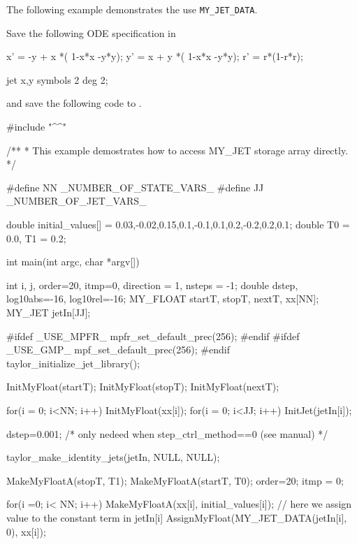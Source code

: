 \documentclass[10pt]{article}
\theoremstyle{remark}
\newcommand{\inputfile}{}
\newcommand{\mainfile}{}
\newcommand{\odehfile}{}
\begin{document}
\vspace{4mm}

The following example demonstrates the use \verb+MY_JET_DATA+.

\vspace{4mm}
Save the following ODE specification in \inputfile{}
\begin{code}[title={File: \inputfile{}}]
    x' = -y + x *( 1-x*x -y*y);
    y' =  x + y *( 1-x*x -y*y);
    r' = r*(1-r*r);
    
    jet x,y  symbols 2 deg 2;
\end{code}
and save the following code to \mainfile{}.
\begin{code}[title={File: \mainfile{}}]
    #include "^\odehfile{}^"
    
    /**
     *  This example demostrates how to access MY_JET storage array directly.
     */
    
    #define NN  _NUMBER_OF_STATE_VARS_
    #define JJ  _NUMBER_OF_JET_VARS_ 
    
    double initial_values[] = {0.03,-0.02,0.15,0.1,-0.1,0.1,0.2,-0.2,0.2,0.1};
    double T0 = 0.0, T1 = 0.2;
     
    int main(int argc, char *argv[])
    {
    	 int       i, j, order=20, itmp=0, direction = 1, nsteps = -1;
    	 double    dstep, log10abs=-16, log10rel=-16;
    	 MY_FLOAT  startT, stopT, nextT, xx[NN];
    	 MY_JET    jetIn[JJ];
    	 
    #ifdef _USE_MPFR_	 
    	 mpfr_set_default_prec(256);
    #endif
    #ifdef _USE_GMP_	 
    	 mpf_set_default_prec(256);
    #endif	 
    	 taylor_initialize_jet_library();
    	 
    	 InitMyFloat(startT);
    	 InitMyFloat(stopT);
    	 InitMyFloat(nextT);
    	 
    	 for(i = 0; i<NN; i++) {InitMyFloat(xx[i]);}
    	 for(i = 0; i<JJ; i++) {InitJet(jetIn[i]);}
    
    
    	 dstep=0.001; /* only nedeed when step_ctrl_method==0 (see manual) */
    
    	 taylor_make_identity_jets(jetIn, NULL, NULL);
    
    	 MakeMyFloatA(stopT, T1);
    	 MakeMyFloatA(startT, T0);	 
    	 order=20;
    	 itmp = 0;
    
    	 for(i =0; i< NN; i++) {
    	   MakeMyFloatA(xx[i],  initial_values[i]);
    	   // here we assign value to the constant term in jetIn[i]
    	   AssignMyFloat(MY_JET_DATA(jetIn[i], 0),  xx[i]);	   	   
    	 }
    
}
\end{code}
\end{document}
